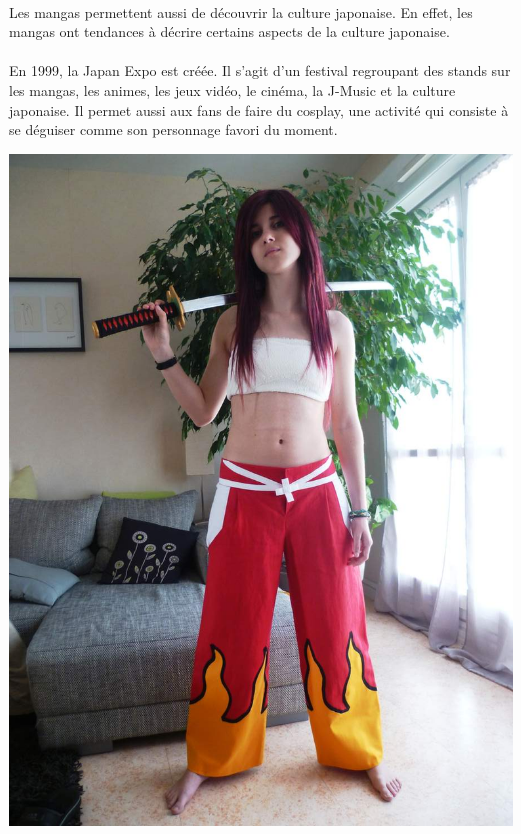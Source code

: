 \paragraph{} Les mangas permettent aussi de découvrir la culture japonaise. En
effet, les mangas ont tendances à décrire certains aspects de la culture
japonaise.

\paragraph{} En 1999, la Japan Expo est créée. Il s'agit d'un festival
regroupant des stands sur les mangas, les animes, les jeux vidéo, le cinéma, la
J-Music et la culture japonaise. Il permet aussi aux fans de faire du cosplay,
une activité qui consiste à se déguiser comme son personnage favori du moment.

\begin{center}
	\includegraphics[scale=0.3, angle=-90]{erza.jpg}
\end{center}

